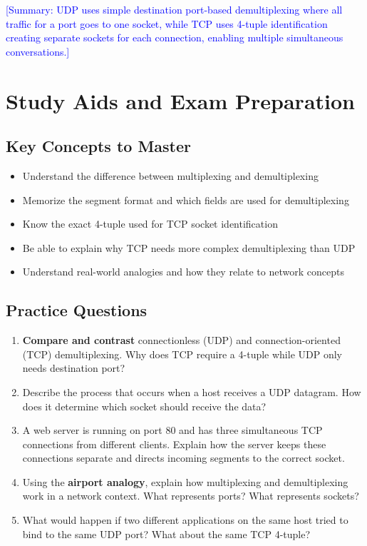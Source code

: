 \documentclass[12pt]{article}
\begin{document}
\textcolor{blue}{[Summary: UDP uses simple destination port-based demultiplexing where all traffic for a port goes to one socket, while TCP uses 4-tuple identification creating separate sockets for each connection, enabling multiple simultaneous conversations.]}

\section{Study Aids and Exam Preparation}

\subsection{Key Concepts to Master}
\begin{itemize}
    \item Understand the difference between multiplexing and demultiplexing
    \item Memorize the segment format and which fields are used for demultiplexing
    \item Know the exact 4-tuple used for TCP socket identification
    \item Be able to explain why TCP needs more complex demultiplexing than UDP
    \item Understand real-world analogies and how they relate to network concepts
\end{itemize}

\subsection{Practice Questions}
\begin{enumerate}
    \item \textbf{Compare and contrast} connectionless (UDP) and connection-oriented (TCP) demultiplexing. Why does TCP require a 4-tuple while UDP only needs destination port?

    \item Describe the process that occurs when a host receives a UDP datagram. How does it determine which socket should receive the data?

    \item A web server is running on port 80 and has three simultaneous TCP connections from different clients. Explain how the server keeps these connections separate and directs incoming segments to the correct socket.

    \item Using the \textbf{airport analogy}, explain how multiplexing and demultiplexing work in a network context. What represents ports? What represents sockets?

    \item What would happen if two different applications on the same host tried to bind to the same UDP port? What about the same TCP 4-tuple?
\end{enumerate}
\end{document}
